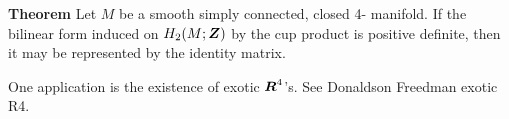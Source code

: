 \documentclass[12pt]{article}
\newcommand {\Z} {\mbox{\boldmath $Z$}}
\newcommand {\R} {\mbox{\boldmath $R$}}
\begin{document}
{\bf Theorem} Let $M$ be a smooth simply connected, closed 4- manifold.  If the bilinear form induced on $H_2(M;\Z)$ by the cup product is positive definite, then it may be represented by the identity matrix.

One application is the existence of exotic $\R^4$'s.  See Donaldson Freedman exotic R4.
\end{document}
